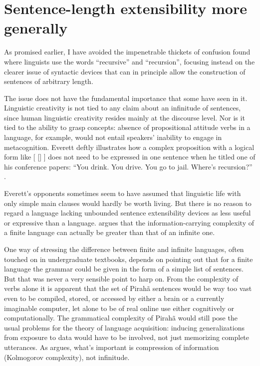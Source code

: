 \documentclass[output=paper,colorlinks,citecolor=brown
]{langscibook}
\begin{document}
\section{Sentence-length extensibility more generally}

As promised earlier, I have avoided the impenetrable thickets of confusion
found where linguists use the words ``recursive'' and ``recursion'', focusing
instead on the clearer issue of syntactic devices that can in principle
allow the construction of sentences of arbitrary length.

The issue does not have the fundamental importance that some have seen
in it. Linguistic creativity is not tied to any claim about an infinitude
of sentences, since human linguistic creativity resides mainly at the
discourse level. Nor is it tied to the ability to grasp concepts:
absence of propositional attitude verbs in a language, for example,
would not entail speakers' inability to engage in metacognition.
Everett deftly illustrates how a complex proposition with a logical
form like [ [] ]  does not need
to be expressed in one sentence when he titled one of his conference
papers: ``You drink. You drive. You go to jail. Where's recursion?''
\citep{Everett10}.

Everett's opponents sometimes seem to have assumed that linguistic
life with only simple main clauses would hardly be worth living.
But there is no reason to regard a language lacking unbounded sentence
extensibility devices as less useful or expressive than a language.
\citet{Kornai14} argues that the information-carrying complexity of
a finite language can actually be greater than that of an infinite one.

One way of stressing the difference between finite and infinite languages,
often touched on in undergraduate textbooks, depends on pointing out that
for a finite language the grammar could be given in the form of a simple
list of sentences. But that was never a very sensible point to harp on.
From the complexity of verbs alone \citep[288--301]{Everett86HAL}
it is apparent that the set of Pirah{\~a} sentences would be way too vast
even to be compiled, stored, or accessed by either a brain or a currently
imaginable computer, let alone to be of real online use either cognitively
or computationally. The grammatical complexity of Pirah{\~a} would still
pose the usual problems for the theory of language acquisition: inducing
generalizations from exposure to data would have to be involved, not just
memorizing complete utterances. As  argues, what's
important is compression of information (Kolmogorov complexity), not
infinitude.
\end{document}
